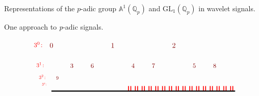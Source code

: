 \documentclass[letterpaper,11pt, reqno]{amsart}
\newtheorem{monodromy theorem}{Monodromy Theorem}[subsection]
\newtheorem{wild conjecture}[theorem]{Wild Conjecture}
\newtheorem{research objectives}{Research objectives}[subsection]
\newtheorem{research question}[theorem]{Research questions}
\newtheorem{aside question}[theorem]{Aside question}
\newtheorem{audio example}[theorem]{\loudspeaker[3] Example}
\newtheorem{blank remark}[theorem]{}
\newtheorem{terminology and comment}[theorem]{Terminology and comment}
\newtheorem{purity hypothesis}[theorem]{Purity hypothesis}
\newtheorem{corollary of the purity hypothesis}[theorem]{Corollary of the purity hypothesis}
\numberwithin{equation}{theorem}
\begin{document}
\begin{section}{Representations of the $p$-adic group $\mathbb{A}^{\!1}(\mathbb{Q}_{p})$
and $\text{GL}_{1}(\mathbb{Q}_{p})$
in wavelet signals.}
\begin{subsection}{One approach to {\em p}-adic signals.}
\begin{figure}[ht]
$$\begin{tikzpicture}
	\draw[red, very thick] (11/3+1/9,0) -- (11/3+1/9,.25);
	\draw[red, very thick] (11/3+2/9,0) -- (11/3+2/9,.25);
	\draw[red, very thick] (12/3+1/9,0) -- (12/3+1/9,.25);
	\draw[red, very thick] (12/3+2/9,0) -- (12/3+2/9,.25);
	\draw[red, very thick] (13/3+1/9,0) -- (13/3+1/9,.25);
	\draw[red, very thick] (13/3+2/9,0) -- (13/3+2/9,.25);
	\draw[red, very thick] (14/3+1/9,0) -- (14/3+1/9,.25);
	\draw[red, very thick] (14/3+2/9,0) -- (14/3+2/9,.25);
	\draw[red, very thick] (15/3+1/9,0) -- (15/3+1/9,.25);
	\draw[red, very thick] (15/3+2/9,0) -- (15/3+2/9,.25);
	\draw[red, very thick] (16/3+1/9,0) -- (16/3+1/9,.25);
	\draw[red, very thick] (16/3+2/9,0) -- (16/3+2/9,.25);
	\draw[red, very thick] (17/3+1/9,0) -- (17/3+1/9,.25);
	\draw[red, very thick] (17/3+2/9,0) -- (17/3+2/9,.25);
	\draw[red, very thick] (18/3+1/9,0) -- (18/3+1/9,.25);
	\draw[red, very thick] (18/3+2/9,0) -- (18/3+2/9,.25);
	\draw[red, very thick] (19/3+1/9,0) -- (19/3+1/9,.25);
	\draw[red, very thick] (19/3+2/9,0) -- (19/3+2/9,.25);
	\draw[red, very thick] (20/3+1/9,0) -- (20/3+1/9,.25);
	\draw[red, very thick] (20/3+2/9,0) -- (20/3+2/9,.25);
	\draw[red, very thick] (21/3+1/9,0) -- (21/3+1/9,.25);
	\draw[red, very thick] (21/3+2/9,0) -- (21/3+2/9,.25);
	\draw[red, very thick] (22/3+1/9,0) -- (22/3+1/9,.25);
	\draw[red, very thick] (22/3+2/9,0) -- (22/3+2/9,.25);
	\draw[red, very thick] (23/3+1/9,0) -- (23/3+1/9,.25);
	\draw[red, very thick] (23/3+2/9,0) -- (23/3+2/9,.25);
	\draw[red, very thick] (24/3+1/9,0) -- (24/3+1/9,.25);
	\draw[red, very thick] (24/3+2/9,0) -- (24/3+2/9,.25);
	\draw[red, very thick] (25/3+1/9,0) -- (25/3+1/9,.25);
	\draw[red, very thick] (25/3+2/9,0) -- (25/3+2/9,.25);
	\draw[red, very thick] (26/3+1/9,0) -- (26/3+1/9,.25);
	\draw[red, very thick] (26/3+2/9,0) -- (26/3+2/9,.25);
	\draw[black, ultra thick] (0,0) -- (9,0);
	\node[red] at (-.65,2.3) {\scalebox{.9}{$3^0\!:$}};
	\node[red] at (-.55,1.3) {\scalebox{.8}{$3^1\!:$}};
	\node[red] at (-.45,.7) {\scalebox{.7}{$3^2\!:$}};
	\node[red] at (-.35,.35) {\scalebox{.5}{$3^3\!:$}};
	\node[red!50!black!100] at (0,2.25) {\scalebox{1}{$0$}};
	\node[red!50!black!100] at (3,2.25) {\scalebox{1}{$1$}};
	\node[red!50!black!100] at (6,2.25) {\scalebox{1}{$2$}};
	\node[red!50!black!100] at (1,1.25) {\scalebox{.9}{$3$}};
	\node[red!50!black!100] at (2,1.25) {\scalebox{.9}{$6$}};
	\node[red!50!black!100] at (4,1.25) {\scalebox{.9}{$4$}};
	\node[red!50!black!100] at (5,1.25) {\scalebox{.9}{$7$}};
	\node[red!50!black!100] at (7,1.25) {\scalebox{.9}{$5$}};
	\node[red!50!black!100] at (8,1.25) {\scalebox{.9}{$8$}};
	\node[red!50!black!100] at (1/3,.65) {\scalebox{.7}{$9\ $}};

\end{tikzpicture}$$
\end{figure}
\end{subsection}
\end{section}
\end{document}

